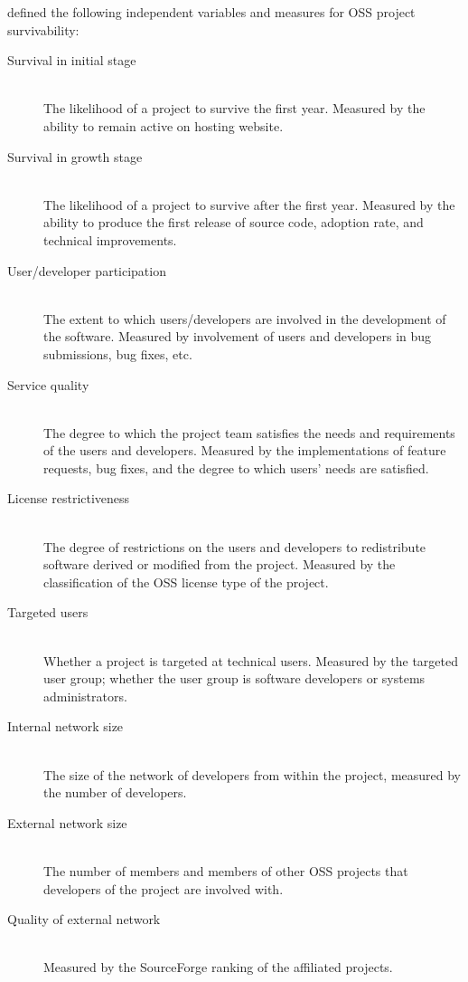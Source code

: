 \noindent
\citeauthor{wang2012} defined the following independent variables and
measures for OSS project survivability:

\begin{description}
	\item[Survival in initial stage] \hfill \\ The likelihood of a project to
		survive the first year. Measured by the ability to remain active on hosting
		website.

	\item[Survival in growth stage] \hfill \\ The likelihood of a project to
		survive after the first year. Measured by the ability to produce the first
		release of source code, adoption rate, and technical improvements.

	\item[User/developer participation] \hfill \\ The extent to which
		users/developers are involved in the development of the software. Measured by
		involvement of users and developers in bug submissions, bug fixes, etc.

	\item[Service quality] \hfill \\ The degree to which the project team satisfies
		the needs and requirements of the users and developers. Measured by the
		implementations of feature requests, bug fixes, and the degree to which users'
		needs are satisfied.

	\item[License restrictiveness] \hfill \\ The degree of restrictions on the
		users and developers to redistribute software derived or modified from the
		project. Measured by the classification of the OSS license type of the
		project.

	\item[Targeted users] \hfill \\ Whether a project is targeted at technical
		users. Measured by the targeted user group; whether the user group is software
		developers or systems administrators.

	\item[Internal network size] \hfill \\ The size of the network of developers
		from within the project, measured by the number of developers.

	\item[External network size] \hfill \\ The number of members and members of
		other OSS projects that developers of the project are involved with.

	\item[Quality of external network] \hfill \\ Measured by the SourceForge
		ranking of the affiliated projects.
\end{description}

